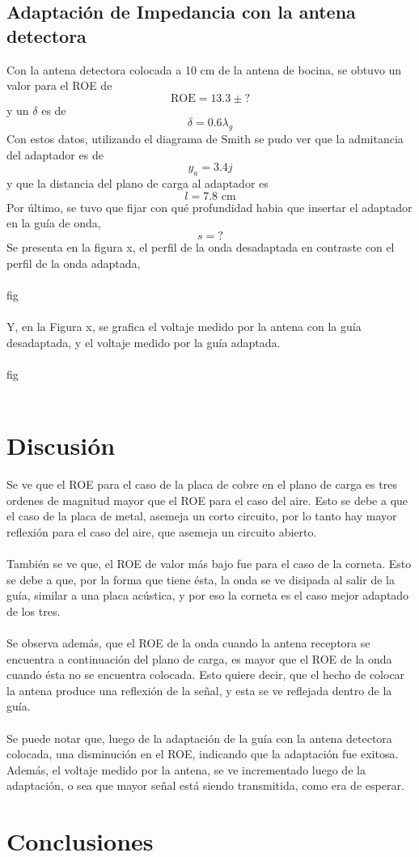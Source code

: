 \documentclass[11pt,a4paper]{article}
\begin{document}
\begin{multicols}{2}
\subsection{Adaptación de Impedancia con la antena detectora}
Con la antena detectora colocada a 10 cm de la antena de bocina, se obtuvo un valor para el ROE de 
$$
\text{ROE} = 13.3\pm?
$$
y un $\delta$ es de
$$
\delta = 0.6\lambda_g
$$
Con estos datos, utilizando el diagrama de Smith se pudo ver que la admitancia del adaptador es de
$$
y_a = 3.4j
$$
y que la distancia del plano de carga al adaptador es
$$
l = 7.8 \text{ cm}
$$
Por último, se tuvo que fijar con qué profundidad habia que insertar el adaptador en la guía de onda,
$$
s = ?
$$
Se presenta en la figura x, el perfil de la onda desadaptada en contraste con el perfil de la onda adaptada,
\\ \\
fig 
\\ \\
Y, en la Figura x, se grafica el voltaje medido por la antena con la guía desadaptada, y el voltaje medido por la guía adaptada.
\\ \\
fig
\\ \\
\section{Discusión}
Se ve que el ROE para el caso de la placa de cobre en el plano de carga es tres ordenes de magnitud mayor que el ROE para el caso del aire. Esto se debe a que el caso de la placa de metal, asemeja un corto circuito, por lo tanto hay mayor reflexión para el caso del aire, que asemeja un circuito abierto. \\ \\
También se ve que, el ROE de valor más bajo fue para el caso de la corneta. Esto se debe a que, por la forma que tiene ésta, la onda se ve disipada al salir de la guía, similar a una placa acústica, y por eso la corneta es el caso mejor adaptado de los tres. \\ \\
Se observa además, que el ROE de la onda cuando la antena receptora se encuentra a continuación del plano de carga, es mayor que el ROE de la onda cuando ésta no se encuentra colocada. Esto quiere decir, que el hecho de colocar la antena produce una reflexión de la señal, y esta se ve reflejada dentro de la guía. \\ \\
Se puede notar que, luego de la adaptación de la guía con la antena detectora colocada, una disminución en el ROE, indicando que la adaptación fue exitosa. Además, el voltaje medido por la antena, se ve incrementado luego de la adaptación, o sea que mayor señal está siendo transmitida, como era de esperar.
\section{Conclusiones}




\end{multicols}
\end{document}
